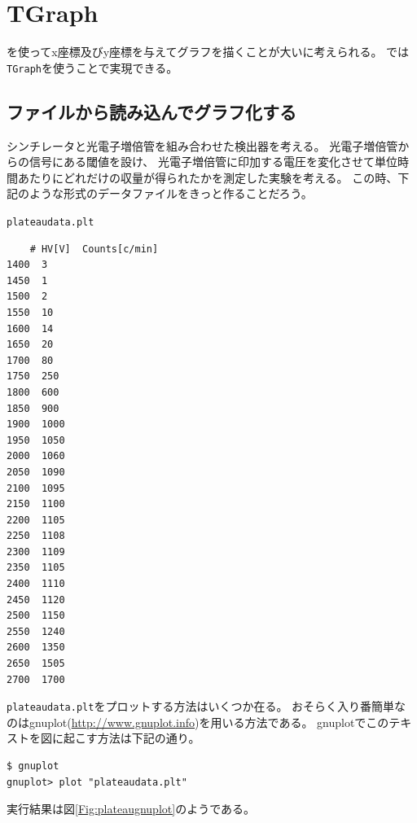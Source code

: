  \clearpage
 \section{TGraph}
 \ROOT を使ってx座標及びy座標を与えてグラフを描くことが大いに考えられる。
 \ROOT では\verb|TGraph|を使うことで実現できる。
 
 
\subsection{ファイルから読み込んでグラフ化する}
シンチレータと光電子増倍管を組み合わせた検出器を考える。
光電子増倍管からの信号にある閾値を設け、
光電子増倍管に印加する電圧を変化させて単位時間あたりにどれだけの収量が得られたかを測定した実験を考える。
この時、下記のような形式のデータファイルをきっと作ることだろう。
 \begin{itembox}{\texttt{plateaudata.plt}}
\begin{verbatim}
	# HV[V]  Counts[c/min]
1400  3
1450  1
1500  2
1550  10
1600  14
1650  20
1700  80
1750  250
1800  600
1850  900
1900  1000
1950  1050
2000  1060
2050  1090
2100  1095
2150  1100
2200  1105
2250  1108
2300  1109
2350  1105
2400  1110
2450  1120
2500  1150
2550  1240
2600  1350
2650  1505
2700  1700
\end{verbatim}
 \end{itembox}
\verb|plateaudata.plt|をプロットする方法はいくつか在る。
おそらく入り番簡単なのはgnuplot(\url{http://www.gnuplot.info})を用いる方法である。
gnuplotでこのテキストを図に起こす方法は下記の通り。
\begin{verbatim}
$ gnuplot
gnuplot> plot "plateaudata.plt"
\end{verbatim}

実行結果は図\ref{Fig:plateaugnuplot}のようである。

